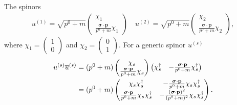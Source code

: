 
The spinors
\begin{eqnarray}
    \label{eq:particle-spinors}
    u^{(1)} = \sqrt{p^{0} + m}
    \begin{pmatrix}
        \chi_1 \\ \frac{ \boldsymbol{\sigma} \cdot \mathbf{p} }{p^{0} + m} \chi_1
    \end{pmatrix} 
    \quad
    u^{(2)} = 
    \sqrt{p^{0} + m}
    \begin{pmatrix}
        \chi_2 \\ \frac{ \boldsymbol{\sigma} \cdot \mathbf{p} }{p^{0} + m} \chi_2
    \end{pmatrix} 
,\end{eqnarray}
where $\displaystyle \chi_1 = \begin{pmatrix} 1 \\ 0 \end{pmatrix}$ and $\displaystyle \chi_2 = \begin{pmatrix} 0 \\ 1 \end{pmatrix}$.
For a generic spinor $u^{(s)}$
\begin{align}
    \label{eq:completeness-work}
    u^{(s)} \overline{u}^{(s)} &= (p^{0} + m) 
    \begin{pmatrix}
        \chi_{s} \\ \frac{ \boldsymbol{\sigma} \cdot \mathbf{p} }{p^{0} + m} \chi_{s}
    \end{pmatrix}
    \begin{pmatrix}
        \chi_{s}^{\dagger} & -\frac{ \boldsymbol{\sigma} \cdot \mathbf{p} }{p^{0} + m} \chi_{s}^{\dagger}
    \end{pmatrix} \notag \\
                               &= (p^{0} + m) 
                               \begin{pmatrix}
                                   \chi_{s} \chi_{s}^{\dagger} & - \frac{ \boldsymbol{\sigma} \cdot \mathbf{p} }{p^{0} + m} \chi_{s} \chi_{s}^{\dagger} \\
                                   \frac{ \boldsymbol{\sigma} \cdot \mathbf{p} }{p^{0} + m} \chi_{s} \chi_{s}^{\dagger} & - \frac{ (\boldsymbol{\sigma} \cdot \mathbf{p})^2 }{(p^{0} + m)^2} \chi_{s} \chi_{s}^{\dagger}
                               \end{pmatrix} 
.\end{align}
